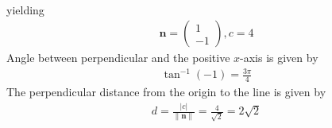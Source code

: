 \documentclass[12pt]{article}
\providecommand{\brak}[1]{\ensuremath{\left(#1\right)}}
\providecommand{\norm}[1]{\left\lVert#1\right\rVert}
\newcommand{\myvec}[1]{\ensuremath{\begin{pmatrix}#1\end{pmatrix}}}
\let\vec\mathbf
\begin{document}
\begin{enumerate}
\begin{align}
                          \end{align}
			  yielding
                  \begin{align}
			  \vec{n}=\myvec{1\\-1}, c = 4
                          \end{align}
          Angle between perpendicular and the positive $x$-axis is given by
		\begin{align}   
			\tan^{-1}\brak{-1} = \frac{3\pi}{4}
                \end{align}                                                                           The perpendicular distance from the origin to the line is given by
		\begin{align}
			d=\frac{|c|}{\norm{\vec{n}}}=\frac{4}{\sqrt{2}}=2\sqrt{2}                    
                  \end{align}
\end{enumerate}
 
\end{document}
